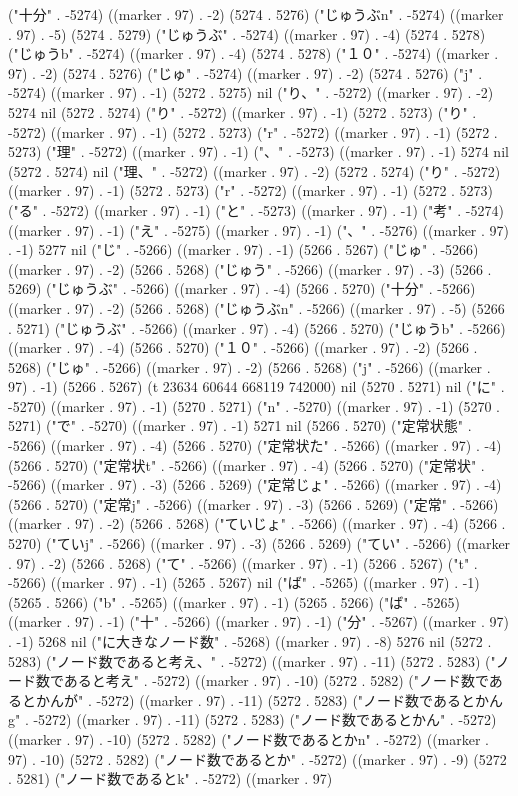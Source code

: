 ("十分" . -5274) ((marker . 97) . -2) (5274 . 5276) ("じゅうぶn" . -5274) ((marker . 97) . -5) (5274 . 5279) ("じゅうぶ" . -5274) ((marker . 97) . -4) (5274 . 5278) ("じゅうb" . -5274) ((marker . 97) . -4) (5274 . 5278) ("１０" . -5274) ((marker . 97) . -2) (5274 . 5276) ("じゅ" . -5274) ((marker . 97) . -2) (5274 . 5276) ("j" . -5274) ((marker . 97) . -1) (5272 . 5275) nil ("り、" . -5272) ((marker . 97) . -2) 5274 nil (5272 . 5274) ("り" . -5272) ((marker . 97) . -1) (5272 . 5273) ("り" . -5272) ((marker . 97) . -1) (5272 . 5273) ("r" . -5272) ((marker . 97) . -1) (5272 . 5273) ("理" . -5272) ((marker . 97) . -1) ("、" . -5273) ((marker . 97) . -1) 5274 nil (5272 . 5274) nil ("理、" . -5272) ((marker . 97) . -2) (5272 . 5274) ("り" . -5272) ((marker . 97) . -1) (5272 . 5273) ("r" . -5272) ((marker . 97) . -1) (5272 . 5273) ("る" . -5272) ((marker . 97) . -1) ("と" . -5273) ((marker . 97) . -1) ("考" . -5274) ((marker . 97) . -1) ("え" . -5275) ((marker . 97) . -1) ("、" . -5276) ((marker . 97) . -1) 5277 nil ("じ" . -5266) ((marker . 97) . -1) (5266 . 5267) ("じゅ" . -5266) ((marker . 97) . -2) (5266 . 5268) ("じゅう" . -5266) ((marker . 97) . -3) (5266 . 5269) ("じゅうぶ" . -5266) ((marker . 97) . -4) (5266 . 5270) ("十分" . -5266) ((marker . 97) . -2) (5266 . 5268) ("じゅうぶn" . -5266) ((marker . 97) . -5) (5266 . 5271) ("じゅうぶ" . -5266) ((marker . 97) . -4) (5266 . 5270) ("じゅうb" . -5266) ((marker . 97) . -4) (5266 . 5270) ("１０" . -5266) ((marker . 97) . -2) (5266 . 5268) ("じゅ" . -5266) ((marker . 97) . -2) (5266 . 5268) ("j" . -5266) ((marker . 97) . -1) (5266 . 5267) (t 23634 60644 668119 742000) nil (5270 . 5271) nil ("に" . -5270) ((marker . 97) . -1) (5270 . 5271) ("n" . -5270) ((marker . 97) . -1) (5270 . 5271) ("で" . -5270) ((marker . 97) . -1) 5271 nil (5266 . 5270) ("定常状態" . -5266) ((marker . 97) . -4) (5266 . 5270) ("定常状た" . -5266) ((marker . 97) . -4) (5266 . 5270) ("定常状t" . -5266) ((marker . 97) . -4) (5266 . 5270) ("定常状" . -5266) ((marker . 97) . -3) (5266 . 5269) ("定常じょ" . -5266) ((marker . 97) . -4) (5266 . 5270) ("定常j" . -5266) ((marker . 97) . -3) (5266 . 5269) ("定常" . -5266) ((marker . 97) . -2) (5266 . 5268) ("ていじょ" . -5266) ((marker . 97) . -4) (5266 . 5270) ("ていj" . -5266) ((marker . 97) . -3) (5266 . 5269) ("てい" . -5266) ((marker . 97) . -2) (5266 . 5268) ("て" . -5266) ((marker . 97) . -1) (5266 . 5267) ("t" . -5266) ((marker . 97) . -1) (5265 . 5267) nil ("ば" . -5265) ((marker . 97) . -1) (5265 . 5266) ("b" . -5265) ((marker . 97) . -1) (5265 . 5266) ("ば" . -5265) ((marker . 97) . -1) ("十" . -5266) ((marker . 97) . -1) ("分" . -5267) ((marker . 97) . -1) 5268 nil ("に大きなノード数" . -5268) ((marker . 97) . -8) 5276 nil (5272 . 5283) ("ノード数であると考え、" . -5272) ((marker . 97) . -11) (5272 . 5283) ("ノード数であると考え" . -5272) ((marker . 97) . -10) (5272 . 5282) ("ノード数であるとかんが" . -5272) ((marker . 97) . -11) (5272 . 5283) ("ノード数であるとかんg" . -5272) ((marker . 97) . -11) (5272 . 5283) ("ノード数であるとかん" . -5272) ((marker . 97) . -10) (5272 . 5282) ("ノード数であるとかn" . -5272) ((marker . 97) . -10) (5272 . 5282) ("ノード数であるとか" . -5272) ((marker . 97) . -9) (5272 . 5281) ("ノード数であるとk" . -5272) ((marker . 97) 